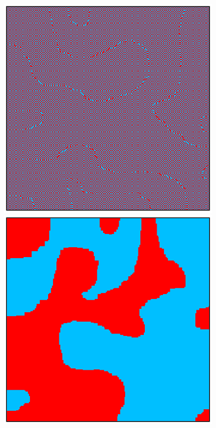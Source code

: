 \begin{figure}[h]
    \hfill
    \begin{minipage}[c]{0.45\textwidth}
        \centering
        \includegraphics[scale=0.45]{./images/ising/T_001_antiferro.eps}
    \end{minipage}
    \hfill
    \begin{minipage}[c]{0.45\textwidth}
        \centering
        \includegraphics[scale=0.45]{./images/ising/T_n001_antiferro.eps}

\end{minipage}
\end{figure}
